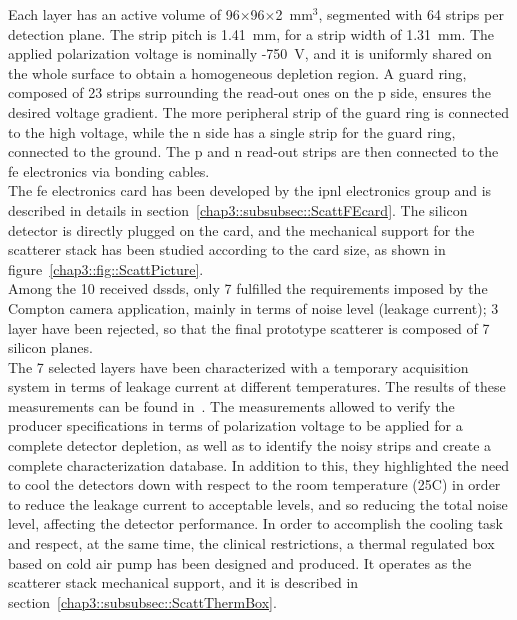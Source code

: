 Each layer has an active volume of 96$\times$96$\times$2~mm$^{3}$, segmented with 64 strips per detection plane. The strip pitch is 1.41~mm, for a strip width of 1.31~mm. The applied polarization voltage is nominally -750~V, and it is uniformly shared on the whole surface to obtain a homogeneous depletion region. A guard ring, composed of 23 strips surrounding the read-out ones on the p side, ensures the desired voltage gradient. The more peripheral strip of the guard ring is connected to the high voltage, while the n side has a single strip for the guard ring, connected to the ground. The p and n read-out strips are then connected to the \gls{fe} electronics via bonding cables.\\
The \gls{fe} electronics card has been developed by the \gls{ipnl} electronics group and is described in details in section~\ref{chap3::subsubsec::ScattFEcard}. The silicon detector is directly plugged on the card, and the mechanical support for the scatterer stack has been studied according to the card size, as shown in figure~\ref{chap3::fig::ScattPicture}.\\   
Among the 10 received \glspl{dssd}, only 7 fulfilled the requirements imposed by the Compton camera application, mainly in terms of noise level (leakage current); 3 layer have been rejected, so that the final prototype scatterer is composed of 7 silicon planes.\\
The 7 selected layers have been characterized with a temporary acquisition system in terms of leakage current at different temperatures. The results of these measurements can be found in~\cite{Ley2015}. The measurements allowed to verify the producer specifications in terms of polarization voltage to be applied for a complete detector depletion, as well as to identify the noisy strips and create a complete characterization database. In addition to this, they highlighted the need to cool the detectors down with respect to the room temperature (25\textdegree{}C) in order to reduce the leakage current to acceptable levels, and so reducing the total noise level, affecting the detector performance. In order to accomplish the cooling task and respect, at the same time, the clinical restrictions, a thermal regulated box based on cold air pump has been designed and produced. It operates as the scatterer stack mechanical support, and it is described in section~\ref{chap3::subsubsec::ScattThermBox}.\\
      
 

